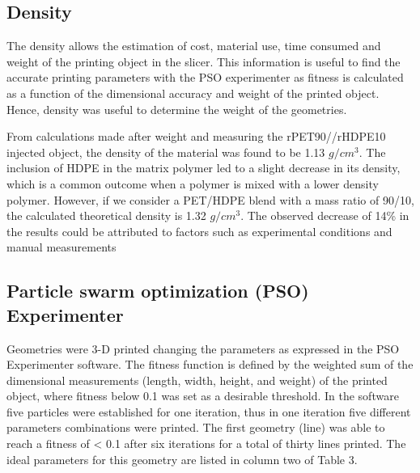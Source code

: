 \documentclass[
  12pt,
  number,
  review]{elsarticle}
\begin{document}
\hypertarget{density-1}{%
\subsection{Density}\label{density-1}}

The density allows the estimation of cost, material use, time consumed
and weight of the printing object in the slicer. This information is
useful to find the accurate printing parameters with the PSO
experimenter as fitness is calculated as a function of the dimensional
accuracy and weight of the printed object. Hence, density was useful to
determine the weight of the geometries.

From calculations made after weight and measuring the rPET90//rHDPE10
injected object, the density of the material was found to be 1.13
\(g/cm^{3}\). The inclusion of HDPE in the matrix polymer led to a
slight decrease in its density, which is a common outcome when a polymer
is mixed with a lower density polymer. However, if we consider a
PET/HDPE blend with a mass ratio of 90/10, the calculated theoretical
density is 1.32 \(g/cm^{3}\). The observed decrease of 14\% in the
results could be attributed to factors such as experimental conditions
and manual measurements

\hypertarget{particle-swarm-optimization-pso-experimenter}{%
\subsection{Particle swarm optimization (PSO)
Experimenter}\label{particle-swarm-optimization-pso-experimenter}}

Geometries were 3-D printed changing the parameters as expressed in the
PSO Experimenter software. The fitness function is defined by the
weighted sum of the dimensional measurements (length, width, height, and
weight) of the printed object, where fitness below 0.1 was set as a
desirable threshold. In the software five particles were established for
one iteration, thus in one iteration five different parameters
combinations were printed. The first geometry (line) was able to reach a
fitness of \textless{} 0.1 after six iterations for a total of thirty
lines printed. The ideal parameters for this geometry are listed in
column two of Table 3.
\end{document}
